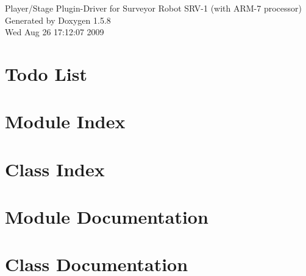 \documentclass[a4paper]{book}
\begin{document}
\begin{titlepage}
\vspace*{7cm}
\begin{center}
{\Large Player/Stage Plugin-Driver for Surveyor Robot SRV-1 (with ARM-7 processor) }\\
\vspace*{1cm}
{\large Generated by Doxygen 1.5.8}\\
\vspace*{0.5cm}
{\small Wed Aug 26 17:12:07 2009}\\
\end{center}
\end{titlepage}
\clearemptydoublepage
{}
\tableofcontents
\clearemptydoublepage
{}
\chapter{Todo List}
\label{todo}
\hypertarget{todo}{}

\chapter{Module Index}

\chapter{Class Index}

\chapter{Module Documentation}

\chapter{Class Documentation}

\printindex
\end{document}
